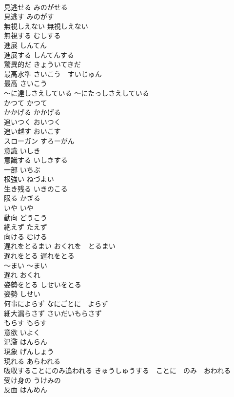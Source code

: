 \documentclass[8pt]{extreport}
\begin{document}
\begin{CJK}{UTF8}{min}
\\	見逃せる	みのがせる	
\\	見逃す	みのがす	
\\	無視しえない	無視しえない	
\\	無視する	むしする	
\\	進展	しんてん	
\\	進展する	しんてんする	
\\	驚異的だ	きょういてきだ	
\\	最高水準	さいこう　すいじゅん	
\\	最高	さいこう	
\\	〜に達しさえしている	〜にたっしさえしている	
\\	かつて	かつて	
\\	かかげる	かかげる	
\\	追いつく	おいつく	
\\	追い越す	おいこす	
\\	スローガン	すろーがん	
\\	意識	いしき	
\\	意識する	いしきする	
\\	一部	いちぶ	
\\	根強い	ねづよい	
\\	生き残る	いきのこる	
\\	限る	かぎる	
\\	いや	いや	
\\	動向	どうこう	
\\	絶えず	たえず	
\\	向ける	むける	
\\	遅れをとるまい	おくれを　とるまい	
\\	遅れをとる	遅れをとる	
\\	〜まい	〜まい	
\\	遅れ	おくれ	
\\	姿勢をとる	しせいをとる	
\\	姿勢	しせい	
\\	何事によらず	なにごとに　よらず	
\\	細大漏らさず	さいだいもらさず	
\\	もらす	もらす	
\\	意欲	いよく	
\\	氾濫	はんらん	
\\	現象	げんしょう	
\\	現れる	あらわれる	
\\	吸収することにのみ追われる	きゅうしゅうする　ことに　のみ　おわれる	
\\	受け身の	うけみの	
\\	反面	はんめん	

\end{CJK}
\end{document}
